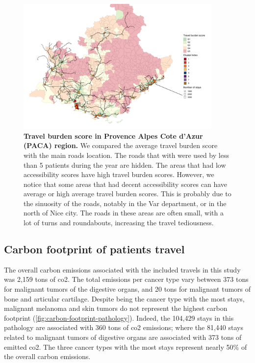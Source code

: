 \begin{figure}[h!]
    \includegraphics[width=0.9\textwidth]{images/routes/fig7.png}
    \centering
    \caption{
        \textbf{Travel burden score in Provence Alpes Cote d'Azur (PACA) region.}
        We compared the average travel burden score with the main roads
        location. The roads that with were used by less than 5 patients during
        the year are hidden. The areas that had low accessibility scores have
        high travel burden scores. However, we notice that some areas that had decent
        accessibility scores can have average or high average travel burden
        scores. This is probably due to the sinuosity of the roads, notably in
        the Var department, or in the north of Nice city. The roads in these
        areas are often small, with a lot of turns and roundabouts, increasing
        the travel tediousness. }
    \label{fig:travel-burden-paca}
\end{figure}

\subsection{Carbon footprint of patients travel}

The overall carbon emissions associated with the included travels in this study
was 2,159 tons of \ac{co2}. The total emissions per cancer type vary between 373
tons for malignant tumors of the digestive organs, and 20 tons for malignant
tumors of bone and articular cartilage. Despite being the cancer type with the
most stays, malignant melanoma and skin tumors do not represent the highest
carbon footprint (\cref{fig:carbon-footprint-pathology}). Indeed, the 104,429
stays in this pathology are associated with 360 tons of \ac{co2} emissions;
where the 81,440 stays related to malignant tumors of digestive organs are
associated with 373 tons of emitted \ac{co2}. The three cancer types with the
most stays represent nearly 50\% of the overall carbon emissions.

